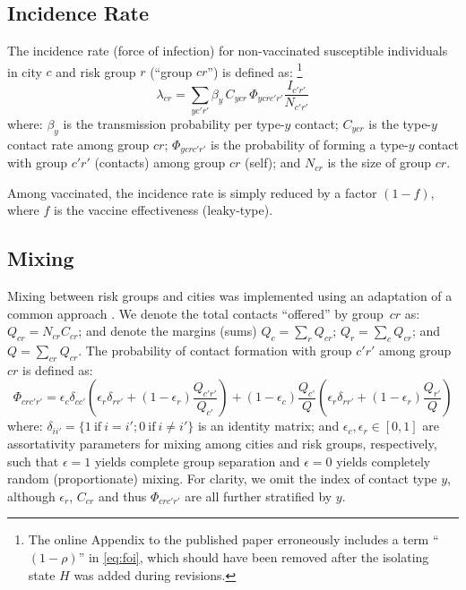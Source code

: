 \subsection{Incidence Rate}\label{app.model.inc}
The incidence rate (force of infection) for
non-vaccinated susceptible individuals in city $c$ and risk group $r$ (``group $cr$'') is defined as:%
\footnote{The online Appendix to the published paper erroneously includes a term ``$(1 - \rho)$''
  in \eqref{eq:foi}, which should have been removed after the isolating state $H$
  was added during revisions.}
\begin{equation}\label{eq:foi}
  \lambda_{cr} = \sum_{yc'r'} \beta_{y}\,C_{ycr}\,\Phi_{ycrc'r'} \frac{I_{c'r'}}{N_{c'r'}}
\end{equation}
where:
$\beta_{y}$ is the transmission probability per type-$y$ contact;
$C_{ycr}$ is the type-$y$ contact rate among group $cr$;
$\Phi_{ycrc'r'}$ is the probability of forming a type-$y$ contact
  with group $c'r'$ (contacts) among group $cr$ (self); and
$N_{cr}$ is the size of group $cr$.
\par
Among vaccinated, the incidence rate is simply reduced by a factor $(1-f)$, where
$f$ is the vaccine effectiveness (leaky-type).
\subsection{Mixing}\label{app.model.mix}
Mixing between risk groups and cities was implemented using
an adaptation of a common approach \cite{Nold1980,Garnett1994}.
We denote the total contacts ``offered'' by group~$cr$ as: $Q_{cr} = N_{cr} C_{cr}$;
and denote the margins (sums) $Q_{c} = \sum_{r}Q_{cr}$; $Q_{r} = \sum_{c} Q_{cr}$; and $Q = \sum_{cr}Q_{cr}$.
The probability of contact formation with group $c'r'$ among group $cr$ is defined as:
\begin{equation}
  \Phi_{crc'r'} =
    \epsilon_c \delta_{cc'} \left(
      \epsilon_r \delta_{rr'} + (1 - \epsilon_r) \frac{Q_{c'r'}}{Q_{c'}}
    \right) +
    (1 - \epsilon_{c}) \frac{Q_{c'}}{Q} \left(
      \epsilon_r \delta_{rr'} + (1 - \epsilon_r) \frac{Q_{r'}}{Q}
    \right)
\end{equation}
where:
$\delta_{ii'} = \{1~\text{if}~i = i'; 0~\text{if}~i \ne i'\}$ is an identity matrix; and
$\epsilon_{c}, \epsilon_{r} \in [0,1]$ are assortativity parameters
for mixing among cities and risk groups, respectively, such that
$\epsilon = 1$ yields complete group separation and
$\epsilon = 0$ yields completely random (proportionate) mixing.
For clarity, we omit the index of contact type $y$,
although $\epsilon_r$, $C_{cr}$ and thus $\Phi_{crc'r'}$ are all further stratified by $y$.
